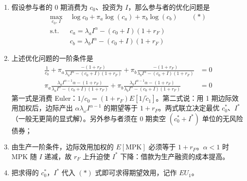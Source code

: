 \begin{solution}
\begin{enumerate}[label=(\alph*)]
    \item 假设参与者的 0 期消费为 $c_{0}$、投资为 $I$，那么参与者的优化问题是
    \[
        \begin{aligned}
            \max_{c_{0},\,I}\;&\log c_{0}+\pi_{a}\log(c_{a})+\pi_{b}\log(c_{b})\qquad(*)\\
            \text{s.t.}\;&c_{a}=\lambda_{a}I^{\alpha}-(c_{0}+I)(1+r_{F})\\
            &c_{b}=\lambda_{b}I^{\alpha}-(c_{0}+I)(1+r_{F})
        \end{aligned}
    \]
    \item 上述优化问题的一阶条件是
    \[
        \begin{aligned}
            \frac{1}{c_{0}}+\pi_{a}\frac{-(1+r_{F})}{\lambda_{a}I^{\alpha}-(c_{0}+I)(1+r_{F})}+\pi_{b}\frac{-(1+r_{F})}{\lambda_{b}I^{\alpha}-(c_{0}+I)(1+r_{F})}&=0\\
            \pi_{a}\frac{\lambda_{a}I^{\alpha-1}\alpha-(1+r_{F})}{\lambda_{a}I^{\alpha}-(c_{0}+I)(1+r_{F})}+\pi_{b}\frac{\lambda_{b}I^{\alpha-1}\alpha-(1+r_{F})}{\lambda_{b}I^{\alpha}-(c_{0}+I)(1+r_{F})}&=0
        \end{aligned}
    \]
    第一式是消费 Euler：$1/c_{0}=(1+r_{F})E[1/\tilde{c}_{1}]$。第二式说：用 1 期边际效用加权后，边际产出 $\alpha\lambda_{\omega}I^{\alpha-1}$ 的期望等于 $1+r_{F}$。两式联立决定最优 $c_{0}^{*}$、$I^{*}$（一般无更简的显式解）。另外参与者须在 0 期卖空 $(c_{0}^{*}+I^{*})$ 单位的无风险债券；
    \item 由生产一阶条件，边际效用加权的 $E[\mathrm{MPK}]$ 必须等于 $1+r_{F}$。$\alpha<1$ 时 MPK 随 $I$ 递减，故 $r_{F}$ 上升迫使 $I^{*}$ 下降：借款为生产融资的成本提高。
    \item 把求得的 $c_{0}^{*}$，$I^{*}$ 代入 $(*)$ 式即可求得期望效用，记作 $EU_{1}$。
\end{enumerate}
\end{solution}


